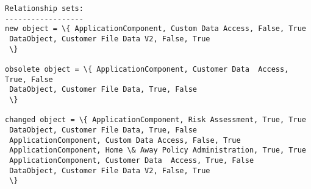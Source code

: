 \documentclass[11pt]{article}
\begin{document}
    \begin{Verbatim}[commandchars=\\\{\}]
Relationship sets:
------------------
new object = \{ ApplicationComponent, Custom Data Access, False, True 
 DataObject, Customer File Data V2, False, True 
 \} 

obsolete object = \{ ApplicationComponent, Customer Data  Access, True, False 
 DataObject, Customer File Data, True, False 
 \} 

changed object = \{ ApplicationComponent, Risk Assessment, True, True 
 DataObject, Customer File Data, True, False 
 ApplicationComponent, Custom Data Access, False, True 
 ApplicationComponent, Home \& Away Policy Administration, True, True 
 ApplicationComponent, Customer Data  Access, True, False 
 DataObject, Customer File Data V2, False, True 
 \} 


\end{Verbatim}
\end{document}
